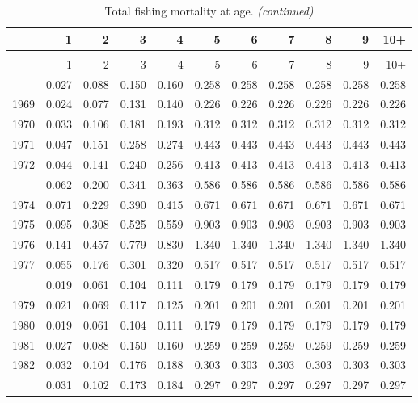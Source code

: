 \documentclass[
]{article}
\begin{document}
\begin{longtable}[t]{lrrrrrrrrrr}
\caption{\label{tab:FAA-tot-table}Total fishing mortality at age.}\\
\toprule
  & 1 & 2 & 3 & 4 & 5 & 6 & 7 & 8 & 9 & 10+\\
\midrule
\endfirsthead
\caption[]{Total fishing mortality at age. \textit{(continued)}}\\
\toprule
  & 1 & 2 & 3 & 4 & 5 & 6 & 7 & 8 & 9 & 10+\\
\midrule
\endhead

\endfoot
\bottomrule
\endlastfoot
1968 & 0.027 & 0.088 & 0.150 & 0.160 & 0.258 & 0.258 & 0.258 & 0.258 & 0.258 & 0.258\\
1969 & 0.024 & 0.077 & 0.131 & 0.140 & 0.226 & 0.226 & 0.226 & 0.226 & 0.226 & 0.226\\
1970 & 0.033 & 0.106 & 0.181 & 0.193 & 0.312 & 0.312 & 0.312 & 0.312 & 0.312 & 0.312\\
1971 & 0.047 & 0.151 & 0.258 & 0.274 & 0.443 & 0.443 & 0.443 & 0.443 & 0.443 & 0.443\\
1972 & 0.044 & 0.141 & 0.240 & 0.256 & 0.413 & 0.413 & 0.413 & 0.413 & 0.413 & 0.413\\
\addlinespace
1973 & 0.062 & 0.200 & 0.341 & 0.363 & 0.586 & 0.586 & 0.586 & 0.586 & 0.586 & 0.586\\
1974 & 0.071 & 0.229 & 0.390 & 0.415 & 0.671 & 0.671 & 0.671 & 0.671 & 0.671 & 0.671\\
1975 & 0.095 & 0.308 & 0.525 & 0.559 & 0.903 & 0.903 & 0.903 & 0.903 & 0.903 & 0.903\\
1976 & 0.141 & 0.457 & 0.779 & 0.830 & 1.340 & 1.340 & 1.340 & 1.340 & 1.340 & 1.340\\
1977 & 0.055 & 0.176 & 0.301 & 0.320 & 0.517 & 0.517 & 0.517 & 0.517 & 0.517 & 0.517\\
\addlinespace
1978 & 0.019 & 0.061 & 0.104 & 0.111 & 0.179 & 0.179 & 0.179 & 0.179 & 0.179 & 0.179\\
1979 & 0.021 & 0.069 & 0.117 & 0.125 & 0.201 & 0.201 & 0.201 & 0.201 & 0.201 & 0.201\\
1980 & 0.019 & 0.061 & 0.104 & 0.111 & 0.179 & 0.179 & 0.179 & 0.179 & 0.179 & 0.179\\
1981 & 0.027 & 0.088 & 0.150 & 0.160 & 0.259 & 0.259 & 0.259 & 0.259 & 0.259 & 0.259\\
1982 & 0.032 & 0.104 & 0.176 & 0.188 & 0.303 & 0.303 & 0.303 & 0.303 & 0.303 & 0.303\\
\addlinespace
1983 & 0.031 & 0.102 & 0.173 & 0.184 & 0.297 & 0.297 & 0.297 & 0.297 & 0.297 & 0.297\\

\end{longtable}
\end{document}
